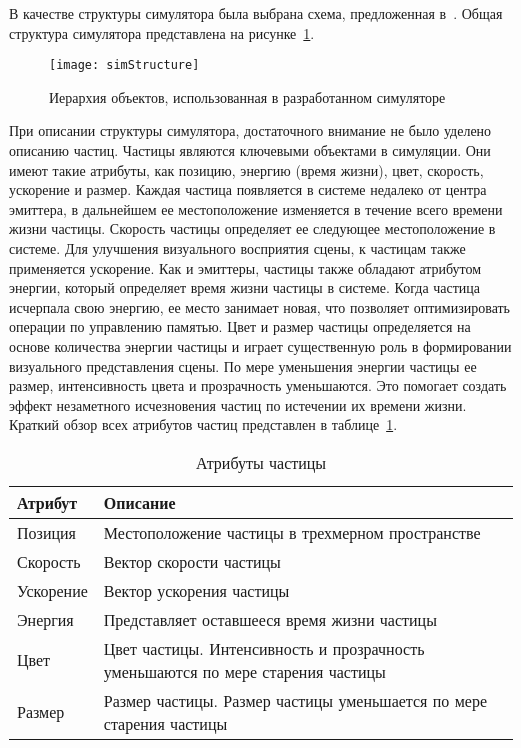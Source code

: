 В качестве структуры симулятора была выбрана схема, предложенная
в~\cite{Somasekaran2005UsingPS}. Общая структура симулятора представлена на
рисунке~\ref{fig:simStructure}.
\begin{figure}[htb]
	\centering
	\texttt{[image: simStructure]}
    \caption{Иерархия объектов, использованная в разработанном симуляторе}%
    \label{fig:simStructure}
\end{figure}

При описании структуры симулятора, достаточного внимание не было уделено
описанию частиц. Частицы являются ключевыми объектами в симуляции. Они имеют
такие атрибуты, как позицию, энергию (время жизни), цвет, скорость, ускорение и
размер.  Каждая частица появляется в системе недалеко от центра эмиттера, в
дальнейшем ее местоположение изменяется в течение всего времени жизни частицы.
Скорость частицы определяет ее следующее местоположение в системе. Для
улучшения визуального восприятия сцены, к частицам также применяется ускорение.
Как и эмиттеры, частицы также обладают атрибутом энергии, который определяет
время жизни частицы в системе. Когда частица исчерпала свою энергию, ее место
занимает новая, что позволяет оптимизировать операции по управлению памятью.
Цвет и размер частицы определяется на основе количества энергии частицы и играет
существенную роль в формировании визуального представления сцены. По мере
уменьшения энергии частицы ее размер, интенсивность цвета и прозрачность
уменьшаются. Это помогает создать эффект незаметного исчезновения частиц по
истечении их времени жизни. Краткий обзор всех атрибутов частиц представлен в
таблице~\ref{table:partAttribs}.
\begin{table}[htb]
\caption{Атрибуты частицы}%
\label{table:partAttribs}
\centering
\small
\begin{tabular}{| p{} | p{} |}
    \hline
    Атрибут & Описание \\
    \hline
    Позиция & Местоположение частицы в трехмерном пространстве \\
    Скорость & Вектор скорости частицы \\
    Ускорение & Вектор ускорения частицы \\
    Энергия & Представляет оставшееся время жизни частицы \\
    Цвет & Цвет частицы. Интенсивность и прозрачность уменьшаются по мере
    старения частицы \\
    Размер & Размер частицы. Размер частицы уменьшается по мере старения частицы \\
    \hline
\end{tabular}
\end{table}

